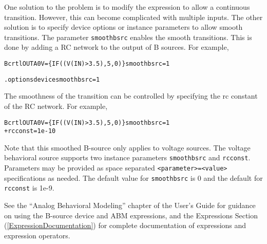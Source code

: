 \begin{Device}
One solution to the problem is to modify the expression to allow a continuous transition. 
However, this can become complicated with multiple inputs. The other solution is to specify
device options or instance parameters to allow smooth transitions. The parameter
\texttt{smoothbsrc} enables the smooth transitions. This is done by adding a RC network to the  
output of B sources. For example,

\begin{alltt} Bcrtl OUTA 0 V=\{ IF( (V(IN) > 3.5), 5, 0 ) \} smoothbsrc=1 \end{alltt}

\begin{alltt} .options device  smoothbsrc=1 \end{alltt}

The smoothness of the transition can be controlled by specifying the rc constant of 
the RC network. For example, 

\begin{alltt} Bcrtl OUTA 0 V=\{ IF( (V(IN) > 3.5), 5, 0 ) \} smoothbsrc=1   
 + rcconst = 1e-10 \end{alltt}

Note that this smoothed B-source only applies to voltage sources. The voltage behavioral source supports
two instance parameters \texttt{smoothbsrc} and \texttt{rcconst}. Parameters may be provided as space  
separated \texttt{<parameter>=<value>} specifications as needed. The default value for \texttt{smoothbsrc}
is 0 and the default for \texttt{rcconst} is 1e-9.

See the ``Analog Behavioral Modeling'' chapter of the \Xyce{} User's
Guide for guidance on using the B-source device and ABM expressions,
and the Expressions Section (\ref{ExpressionDocumentation}) for
complete documentation of expressions and expression operators.

\end{Device}
